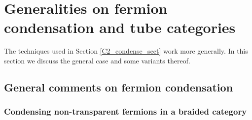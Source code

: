 \documentclass[12pt,a4paper]{article}
\begin{document}

\section{Generalities on fermion condensation and tube categories} \label{generalities} 

The techniques used in Section \ref{C2_condense_sect} work more generally.
In this section we discuss the general case and some variants thereof.

\subsection{General comments on fermion condensation}

\subsubsection{Condensing non-transparent fermions in a braided category}  \label{gntf_condense}
\end{document}
